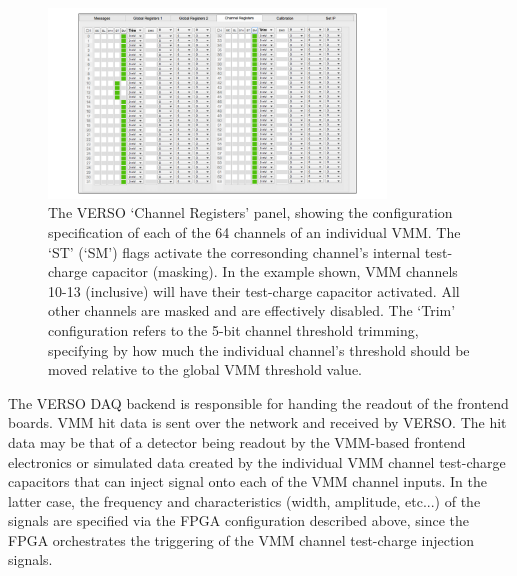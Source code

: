 \begin{figure}[!htb]
    \begin{center}
        \includegraphics[width=0.8\textwidth]{figures/nsw/vrs/verso_chanreg}
        \caption{
            The VERSO `Channel Registers' panel, showing the configuration specification
            of each of the 64 channels of an individual VMM.
            The `ST' (`SM') flags activate the corresonding channel's internal test-charge
            capacitor (masking).
            In the example shown, VMM channels 10-13 (inclusive) will have their
            test-charge capacitor activated. All other channels are masked and
            are effectively disabled.
            The `Trim' configuration refers to the 5-bit channel threshold trimming,
            specifying by how much the individual channel's threshold should be moved
            relative to the global VMM threshold value.
        }
        \label{fig:verso_chanreg}
    \end{center}
\end{figure}

The VERSO DAQ backend is responsible for handing the readout of the frontend boards.
VMM hit data is sent over the network and received by VERSO.
The hit data may be that of a detector being readout by the VMM-based frontend electronics
or simulated data created by the individual VMM channel test-charge capacitors that can inject
signal onto each of the VMM channel inputs.
In the latter case, the frequency and characteristics (width, amplitude, etc...) of the
signals are specified via the FPGA configuration described above, since the FPGA orchestrates
the triggering of the VMM channel test-charge injection signals.

